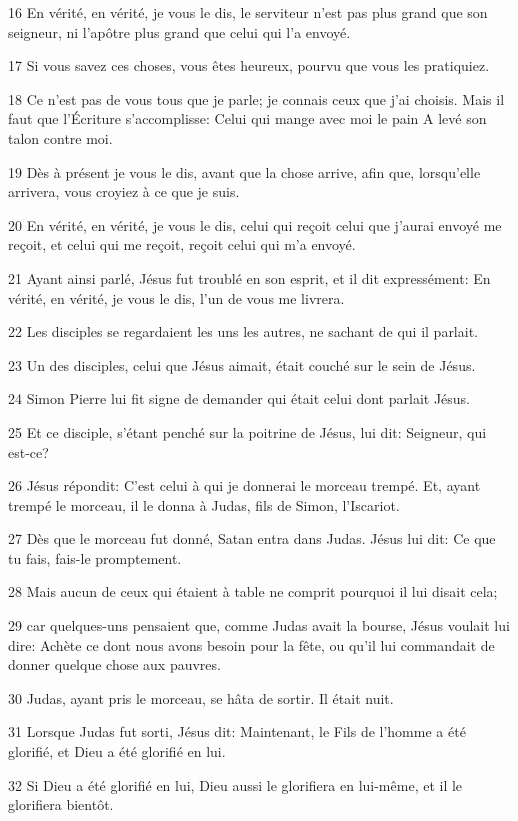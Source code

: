 \par 16 En vérité, en vérité, je vous le dis, le serviteur n'est pas plus grand que son seigneur, ni l'apôtre plus grand que celui qui l'a envoyé.
\par 17 Si vous savez ces choses, vous êtes heureux, pourvu que vous les pratiquiez.
\par 18 Ce n'est pas de vous tous que je parle; je connais ceux que j'ai choisis. Mais il faut que l'Écriture s'accomplisse: Celui qui mange avec moi le pain A levé son talon contre moi.
\par 19 Dès à présent je vous le dis, avant que la chose arrive, afin que, lorsqu'elle arrivera, vous croyiez à ce que je suis.
\par 20 En vérité, en vérité, je vous le dis, celui qui reçoit celui que j'aurai envoyé me reçoit, et celui qui me reçoit, reçoit celui qui m'a envoyé.
\par 21 Ayant ainsi parlé, Jésus fut troublé en son esprit, et il dit expressément: En vérité, en vérité, je vous le dis, l'un de vous me livrera.
\par 22 Les disciples se regardaient les uns les autres, ne sachant de qui il parlait.
\par 23 Un des disciples, celui que Jésus aimait, était couché sur le sein de Jésus.
\par 24 Simon Pierre lui fit signe de demander qui était celui dont parlait Jésus.
\par 25 Et ce disciple, s'étant penché sur la poitrine de Jésus, lui dit: Seigneur, qui est-ce?
\par 26 Jésus répondit: C'est celui à qui je donnerai le morceau trempé. Et, ayant trempé le morceau, il le donna à Judas, fils de Simon, l'Iscariot.
\par 27 Dès que le morceau fut donné, Satan entra dans Judas. Jésus lui dit: Ce que tu fais, fais-le promptement.
\par 28 Mais aucun de ceux qui étaient à table ne comprit pourquoi il lui disait cela;
\par 29 car quelques-uns pensaient que, comme Judas avait la bourse, Jésus voulait lui dire: Achète ce dont nous avons besoin pour la fête, ou qu'il lui commandait de donner quelque chose aux pauvres.
\par 30 Judas, ayant pris le morceau, se hâta de sortir. Il était nuit.
\par 31 Lorsque Judas fut sorti, Jésus dit: Maintenant, le Fils de l'homme a été glorifié, et Dieu a été glorifié en lui.
\par 32 Si Dieu a été glorifié en lui, Dieu aussi le glorifiera en lui-même, et il le glorifiera bientôt.
